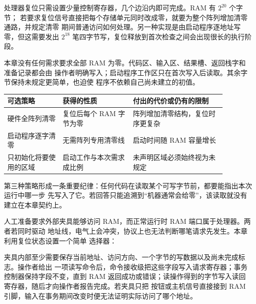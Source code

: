 处理器复位只需设置少量控制寄存器，几个边沿内即可完成。RAM 有 \(2^{20}\) 个字节；
若要求复位信号直接把每个存储单元同时改成零，就要为整个阵列增加清零通路，并规定清零
期间普通访问如何处理。另一种实现是由启动程序逐地址写零，但这需要发出
\(2^{18}\) 笔四字节写，复位释放到首次检查之间会出现很长的执行阶段。

本章没有任何需求要求全部 RAM 为零。代码区、输入区、结果槽、返回栈字和准备记录都会由
操作者明确写入；启动程序工作区只在首次写入后读取。其余字节保持未规定更简单，也迫使
程序不依赖自己尚未建立的初值。

\begin{longtable}{|L{0.22\linewidth}|L{0.29\linewidth}|L{0.37\linewidth}|}
\hline
{}
可选策略 & 获得的性质 & 付出的代价或仍有的限制 \\ \hline
硬件全阵列清零 & 复位后每个 RAM 字节为零 & 阵列增加清零结构，复位时序更复杂 \\ \hline
启动程序逐字清零 & 无需阵列专用清零线 & 启动时间随 RAM 容量增长 \\ \hline
只初始化将要使用的区域 & 启动工作与本次需求成比例 & 未声明区域必须始终视为未规定 \\ \hline
\end{longtable}

第三种策略形成一条重要纪律：任何代码在读取某个可写字节前，都要能指出本次运行中哪一步
先写入了它。若回答只能追溯到“机器通常会给零”，该读取就没有建立在本章契约上。


人工准备要求外部夹具能够访问 RAM，而正常运行时 RAM 端口属于处理器。两者若同时驱动
地址线，电气上会冲突，协议上也无法判断哪笔请求先发生。本章利用复位状态设置一个简单
选择器：

夹具内部至少需要保存当前地址、访问方向、一个字节的写数据以及尚未完成标志。操作者给出
一项读写命令后，命令接收级把这些字段写入请求寄存器；事务控制器保持字段不变，直到 RAM
返回成功或错误；读操作得到的字节写入读回寄存器，随后才向操作者报告完成。若夹具只把
按钮或主机信号直接接到 RAM 引脚，输入在事务期间改变时便无法证明实际访问了哪个地址。

